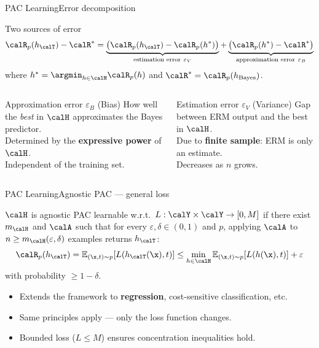 \begin{frame}{PAC Learning}{Error decomposition}
  \begin{block}{Two sources of error}
    \[
      \calR_p(h_\calT) - \calR^*
      =
      \underbrace{\bigl(\calR_p(h_\calT) - \calR_p(h^*)\bigr)}_{\text{estimation error}\ \varepsilon_V}
      +
      \underbrace{\bigl(\calR_p(h^*) - \calR^*\bigr)}_{\text{approximation error}\ \varepsilon_B}
    \]
    where $h^* = \argmin_{h\in\calH}\calR_p(h)$ and $\calR^* = \calR_p(h_{\text{Bayes}})$.
  \end{block}
  \bigskip
  \begin{columns}[T]
    \begin{block}{Approximation error $\varepsilon_B$ (Bias)}
      How well the \emph{best} in $\calH$ approximates the Bayes predictor.\\[4pt]
      Determined by the \textbf{expressive power} of $\calH$.\\[4pt]
      Independent of the training set.
    \end{block}
    \begin{block}{Estimation error $\varepsilon_V$ (Variance)}
      Gap between ERM output and the best in $\calH$.\\[4pt]
      Due to \textbf{finite sample}: ERM is only an estimate.\\[4pt]
      Decreases as $n$ grows.
    \end{block}
  \end{columns}
\end{frame}

\begin{frame}{PAC Learning}{Agnostic PAC — general loss}
  \begin{mydefinition}
    $\calH$ is agnostic PAC learnable w.r.t.\ $L:\calY\times\calY\to[0,M]$ if there
    exist $m_\calH$ and $\calA$ such that for every $\varepsilon,\delta\in(0,1)$ and $p$,
    applying $\calA$ to $n\geq m_\calH(\varepsilon,\delta)$ examples returns $h_\calT$:
    \[
      \calR_p(h_\calT) = \mathbb{E}_{(\x,t)\sim p}[L(h_\calT(\x),t)]
      \leq \min_{h\in\calH} \mathbb{E}_{(\x,t)\sim p}[L(h(\x),t)] + \varepsilon
    \]
    with probability $\geq 1-\delta$.
  \end{mydefinition}
  \bigskip
  \begin{itemize}
    \item Extends the framework to \textbf{regression}, cost-sensitive classification, etc.
    \item Same principles apply — only the loss function changes.
    \item Bounded loss ($L \leq M$) ensures concentration inequalities hold.
  \end{itemize}
\end{frame}

